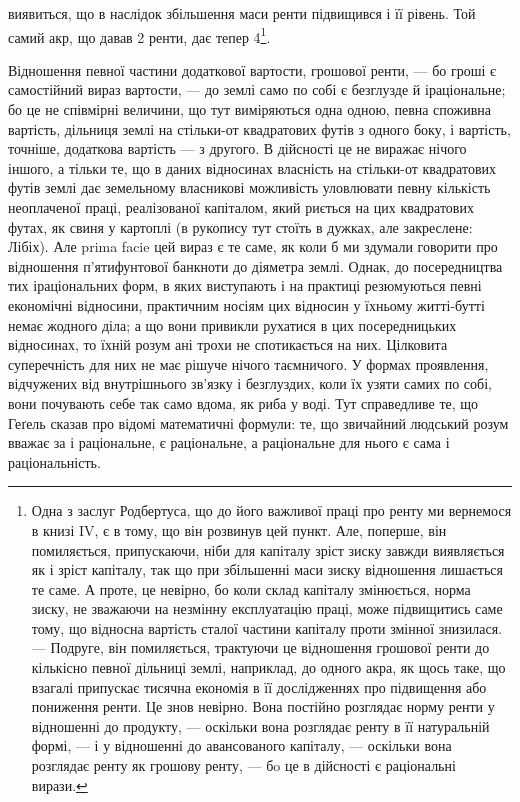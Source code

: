 \parcont{}  %
виявиться, що в наслідок збільшення маси ренти підвищився і її рівень. Той
самий акр, що давав 2 ренти, дає тепер 4\footnote{
Одна з заслуг Родбертуса, що до його важливої праці про ренту ми вернемося в книзі IV,
є в тому, що він розвинув цей пункт. Але, поперше, він помиляється, припускаючи, ніби для капіталу
зріст зиску завжди виявляється як і зріст капіталу, так що при збільшенні маси зиску відношення
лишається
те саме. А проте, це невірно, бо коли склад капіталу змінюється, норма зиску, не зважаючи на
незмінну експлуатацію праці, може підвищитись саме тому, що відносна вартість сталої частини
капіталу
проти змінної знизилася. — Подруге, він помиляється, трактуючи це відношення грошової ренти до
кількісно певної дільниці землі, наприклад, до одного акра, як щось таке, що взагалі припускає
тисячна
економія в її дослідженнях про підвищення або пониження ренти. Це знов невірно. Вона постійно
розглядає норму ренти у відношенні до продукту, — оскільки вона розглядає ренту в її натуральній
формі, — і у відношенні до авансованого капіталу, — оскільки вона розглядає ренту як грошову ренту,
—
бo це в дійсності є раціональні вирази.
}.

Відношення певної частини додаткової вартости, грошової ренти, — бо гроші
є самостійний вираз вартости, — до землі само по собі є безглузде й іраціональне;
бо це не співмірні величини, що тут виміряються одна одною, певна
споживна вартість, дільниця землі на стільки-от квадратових футів з одного
боку, і вартість, точніше, додаткова вартість — з другого. В дійсності це не виражає
нічого іншого, а тільки те, що в даних відносинах власність на стільки-от квадратових
футів землі дає земельному власникові можливість уловлювати певну кількість
неоплаченої праці, реалізованої капіталом, який риється на цих квадратових футах,
як свиня у картоплі (в рукопису тут стоїть в дужках, але закреслене: Лібіх). Але
prima facie цей вираз є те саме, як коли б ми здумали говорити про відношення
п’ятифунтової банкноти до діяметра землі. Однак, до посередництва тих іраціональних
форм, в яких виступають і на практиці резюмуються певні економічні
відносини, практичним носіям цих відносин у їхньому житті-бутті немає
жодного діла; а що вони привикли рухатися в цих посередницьких відносинах,
то їхній розум ані трохи не спотикається на них. Цілковита суперечність для них
не має рішуче нічого таємничого. У формах проявлення, відчужених від внутрішнього
зв’язку і безглуздих, коли їх узяти самих по собі, вони почувають себе
так само вдома, як риба у воді. Тут справедливе те, що Геґель сказав про
відомі математичні формули: те, що звичайний людський розум вважає за
і раціональне, є раціональне, а раціональне для нього є сама і раціональність.


